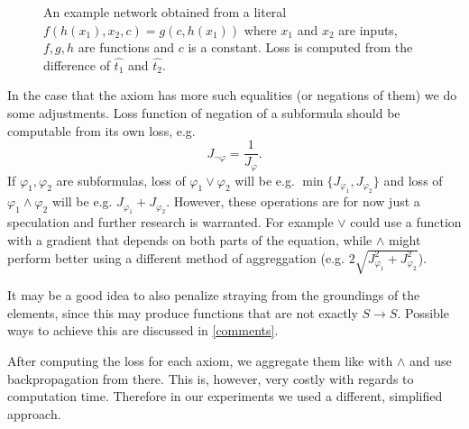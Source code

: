 \begin{figure}
\caption{An example network obtained from a literal $f(h(x_1),x_2,c)=g(c,h(x_1))$ where $x_1$ and $x_2$ are inputs, $f,g,h$ are functions and $c$ is a constant. Loss is computed from the difference of $\widehat{t_1}$ and $\widehat{t_2}$.}
\centering
\label{nndiagram2}
\end{figure}

In the case that the axiom has more such equalities (or negations of them) we do some adjustments. Loss function of negation of a subformula should be computable from its own loss, e.g. $$J_{\neg\varphi}=\frac{1}{J_{\varphi}}.$$ If $\varphi_1,\varphi_2$ are subformulas, loss of $\varphi_1\vee \varphi_2$ will be e.g. $\min\{J_{\varphi_1},J_{\varphi_2}\}$ and loss of $\varphi_1\wedge \varphi_2$ will be e.g. $J_{\varphi_1}+J_{\varphi_2}$. However, these operations are for now just a speculation and further research is warranted. For example $\vee$ could use a function with a gradient that depends on both parts of the equation, while $\wedge$ might perform better using a different method of aggreggation (e.g. $2\sqrt{J_{\varphi_1}^2+J_{\varphi_2}^2}$).

It may be a good idea to also penalize straying from the groundings of the elements, since this may produce functions that are not exactly $S\rightarrow S$. Possible ways to achieve this are discussed in \autoref{comments}.

After computing the loss for each axiom, we aggregate them like with $\wedge$ and use backpropagation from there. This is, however, very costly with regards to computation time. Therefore in our experiments we used a different, simplified approach.

